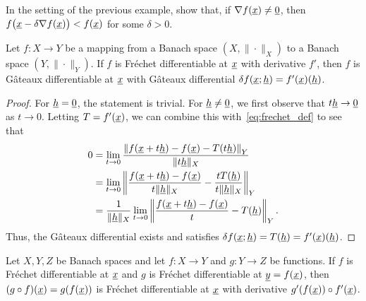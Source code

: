 \begin{problem}
In the setting of the previous example, show that, if $\nabla f (\underline{x}) \neq \underline{0}$, then $f\big(\underline{x}-\delta \nabla f(\underline{x})\big) < f(\underline{x})$ for some $\delta >0$.
\end{problem}

\begin{theorem} \label{theorem:frechet2gateaux}
Let $f \colon X \rightarrow Y$ be a mapping from a Banach space $(X,\|\cdot\|_X)$ to a Banach space $(Y,\|\cdot\|_Y)$.
If $f$ is Fr\'{e}chet differentiable at $\underline{x}$ with derivative $f'$, then $f$ is G\^{a}teaux differentiable at $\underline{x}$ with G\^{a}teaux differential $\delta f (\underline{x};\underline{h}) = f'(\underline{x}) (\underline{h})$.
\end{theorem}
\begin{proof}
For $\underline{h} = \underline{0}$, the statement is trivial.
For $\underline{h} \neq \underline{0}$, we first observe that $t\underline{h} \to \underline{0}$ as $t \to 0$.
Letting $T=f'(\underline{x})$, we can combine this with~\eqref{eq:frechet_def} to see that
\begin{align*}
0 &= \lim_{t \to 0} \frac{\left\|f(\underline{x}+ t\underline{h}) - f(\underline{x}) - T(t\underline{h}) \right\|_Y}{\| t\underline{h} \|_X} \\
&= \lim_{t \to 0} \left\|\frac{f(\underline{x}+ t\underline{h}) - f(\underline{x})}{t \| \underline{h} \|_X} - \frac{ t T(\underline{h})}{t \| \underline{h} \|_X} \right\|_Y \\
&= \frac{1}{\| \underline{h} \|_X}  \lim_{t \to 0} \left\|\frac{f(\underline{x}+ t\underline{h}) - f(\underline{x})}{t} - T(\underline{h}) \right\|_Y.
\end{align*}
Thus, the G\^{a}teaux differential exists and satisfies $\delta f (\underline{x};\underline{h}) = T (\underline{h}) = f'(\underline{x}) (\underline{h})$.
\end{proof}

\begin{theorem}
Let $X,Y,Z$ be Banach spaces and let $f \colon X \rightarrow Y$ and $g\colon Y \to Z$ be functions.
If $f$ is Fr\'{e}chet differentiable at $\underline{x}$ and $g$ is Fr\'{e}chet differentiable at $\underline{y}=f(\underline{x})$, then $(g \circ f) (\underline{x}) = g(f(\underline{x}))$ is Fr\'{e}chet differentiable at $\underline{x}$ with derivative $g'(f(\underline{x}))\circ f'(\underline{x})$.
\end{theorem}

